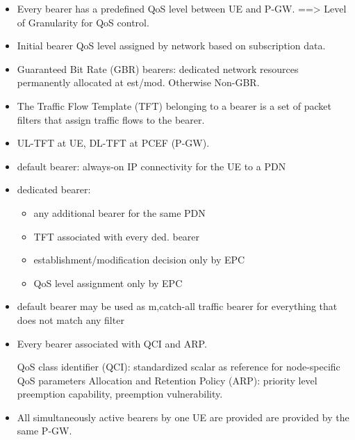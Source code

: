 \begin{itemize}
\item 	Every bearer has a predefined QoS level between UE and P-GW.
		==> Level of Granularity for QoS control.
\item	Initial bearer QoS level assigned by network based on subscription data.
\item	Guaranteed Bit Rate (GBR) bearers: dedicated network resources permanently allocated at est/mod. Otherwise Non-GBR.
\item	The Traffic Flow Template (TFT) belonging to a bearer is a set of packet filters that assign traffic flows to the bearer.
\item	UL-TFT at UE, DL-TFT at \gls{PCEF} (P-GW).
\item 	default bearer: always-on IP connectivity for the UE to a PDN
\item	dedicated bearer:   
			\begin{itemize}
				\item any additional bearer for the same PDN
				\item \gls{TFT} associated with every ded. bearer
				\item establishment/modification decision only by \gls{EPC}
				\item QoS level assignment only by \gls{EPC}
			\end{itemize}

\item	default bearer may be used as {m,c}atch-all traffic bearer for everything that does not match any filter
\item	Every bearer associated with QCI and ARP.

QoS class identifier (QCI): standardized scalar as reference for node-specific QoS parameters
Allocation and Retention Policy (ARP): priority level preemption capability, preemption vulnerability.

\item	All simultaneously active bearers by one UE are provided are provided by the same P-GW.
\end{itemize}








